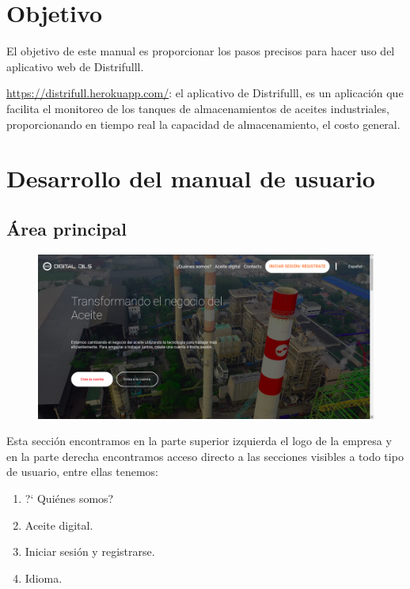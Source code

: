 \chapter*{Objetivo}
El objetivo de este manual es proporcionar los pasos precisos para hacer uso del aplicativo web de Distrifulll.

\begin{definicion}
	{\rm \url{https://distrifull.herokuapp.com/}: } el aplicativo de Distrifulll, es un aplicaci\'on que facilita el monitoreo de los tanques de almacenamientos de aceites industriales, proporcionando en tiempo real la capacidad de almacenamiento, el costo general. 
\end{definicion}

\chapter*{Desarrollo del manual de usuario}

\section*{\'Area principal}

\begin{figure}[h!]
	\centering
	\includegraphics[width=1\linewidth, height=0.4\textheight]{imagenes/inicioOne}
	\caption[Primera parte del inicio.]{}
	\label{fig:inicioone}
\end{figure}
Esta secci\'on encontramos en la parte superior izquierda el logo de la empresa y en la parte derecha encontramos acceso directo a las secciones visibles a todo tipo de usuario, entre ellas tenemos:
\begin{enumerate}
	\item ?` Qui\'enes somos?
	\item Aceite digital.
	\item Iniciar sesi\'on y registrarse.
	\item Idioma.
\end{enumerate}

